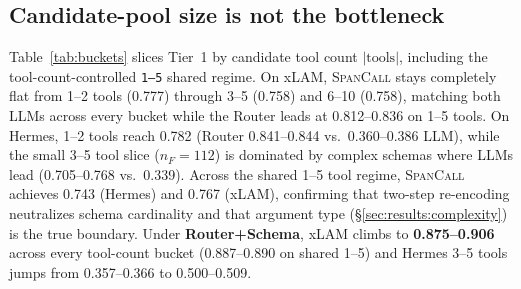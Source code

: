 \subsection{Candidate-pool size is not the bottleneck}
Table~\ref{tab:buckets} slices Tier~1 by candidate tool count $|\text{tools}|$, including the tool-count-controlled \texttt{1--5} shared regime. On xLAM, \textsc{SpanCall} stays completely flat from 1--2 tools (0.777) through 3--5 (0.758) and 6--10 (0.758), matching both LLMs across every bucket while the Router leads at 0.812--0.836 on 1--5 tools. On Hermes, 1--2 tools reach 0.782 (Router 0.841--0.844 vs.\ 0.360--0.386 LLM), while the small 3--5 tool slice ($n_F{=}112$) is dominated by complex schemas where LLMs lead (0.705--0.768 vs.\ 0.339). Across the shared 1--5 tool regime, \textsc{SpanCall} achieves 0.743 (Hermes) and 0.767 (xLAM), confirming that two-step re-encoding neutralizes schema cardinality and that argument type (\S\ref{sec:results:complexity}) is the true boundary. Under \textbf{Router+Schema}, xLAM climbs to \textbf{0.875--0.906} across every tool-count bucket (0.887--0.890 on shared 1--5) and Hermes 3--5 tools jumps from 0.357--0.366 to 0.500--0.509.